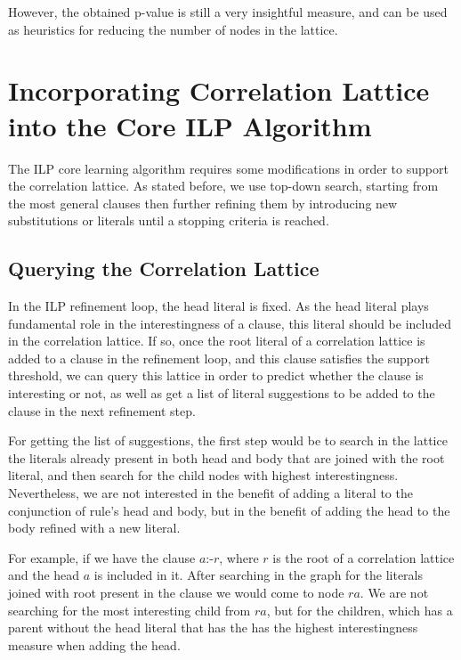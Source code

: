 However, the obtained p-value is still a very insightful measure, and can be used as heuristics for reducing the
number of nodes in the lattice.

\section{Incorporating Correlation Lattice into the Core ILP Algorithm}
\label{sec:incorporation}

The ILP core learning algorithm requires some modifications in order to support the correlation lattice. As stated
before, we use top-down search, starting from the most general clauses then further refining them by introducing
new substitutions or literals until a stopping criteria is reached.

\subsection{Querying the Correlation Lattice}
\label{sec:queryingTheLattice}

In the ILP refinement loop, the head literal is fixed. As the head literal plays fundamental role in the
interestingness of a clause, this literal should be included in the correlation lattice. If so, once the root literal
of a correlation lattice is added to a clause in the refinement loop, and this clause satisfies the support threshold,
we can query this lattice in order to predict whether the clause is interesting or not, as well as get a list of
literal suggestions to be added to the clause in the next refinement step.

For getting the list of suggestions, the first step would be to search in the lattice the literals already present in
both head and body that are joined with the root literal, and then search for the child nodes with
highest interestingness. Nevertheless, we are not interested in the benefit of adding a literal to the conjunction
of rule's head and body, but in the benefit of adding the head to the body refined with a new literal.

For example, if we have the clause $a$:-$r$, where $r$ is the root of a correlation lattice and the head $a$ is included
in it. After searching in the graph for the literals joined with root present in the clause we would come to node
$ra$. We are not searching for the most interesting child from $ra$, but for the children, which has a parent without
the head literal that has the has the highest interestingness measure when adding the head.

